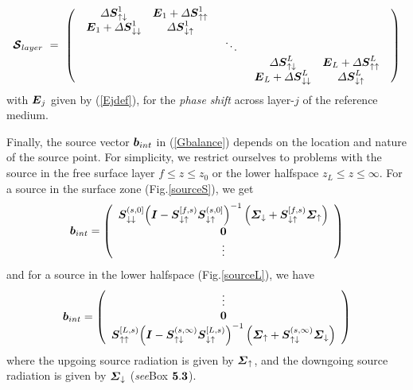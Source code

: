 \begin{equation} \label{Slayer}
{\mbox{\boldmath$\cal S$\unboldmath}}_{{layer}} \ =\ \left({\begin{array}{ccc}
\begin{array}{cc}{\mit \Delta}{\mbox{\boldmath$\mit S$\unboldmath}}_{\uparrow
\downarrow }^{1}&{\mbox{\boldmath$\mit E$\unboldmath}}_{1}+{\mit \Delta}{\mbox{\boldmath$\mit S$\unboldmath}}_{\uparrow \uparrow }^{1}\\ 
{\mbox{\boldmath$\mit E$\unboldmath}}_{1}+{\mit \Delta}{\mbox{\boldmath$\mit S$\unboldmath}}_{\downarrow\downarrow }^{1}&{\mit \Delta}{\mbox{\boldmath$\mit S$\unboldmath}}_{\downarrow \uparrow }^{1}
\end{array}&&\\ 
& \ddots &\\  
&&\begin{array}{cc}{\mit \Delta}{\mbox{\boldmath$\mit S$\unboldmath}}_{\uparrow \downarrow 
}^{L}&{\mbox{\boldmath$\mit E$\unboldmath}}_{L}+{\mit \Delta}{\mbox{\boldmath$\mit S$\unboldmath}}_{\uparrow \uparrow }^{L}\\ 
{\mbox{\boldmath$\mit E$\unboldmath}}_{L}+{\mit \Delta}{\mbox{\boldmath$\mit S$\unboldmath}}_{\downarrow \downarrow }^{L}
&{\mit \Delta}{\mbox{\boldmath$\mit S$\unboldmath}}_{\downarrow \uparrow }^{L}\end{array}
\end{array}}\right)
\end{equation}
with ${\mbox{\boldmath$\mit E$\unboldmath}}_{j}$ given by (\ref{Ejdef}), for
the {\em phase shift\/} across layer-$j$ of the reference medium. 

Finally, the source vector ${\mbox{\boldmath$\mit b$\unboldmath}}_{{int}}$ in (\ref{Gbalance})  
depends on the location and nature of the source point. For simplicity, 
we restrict ourselves to problems with the source in the free surface 
layer $f\le z \le z_0$ or the lower halfspace $z_L \le z \le \infty$.
For a source in the surface zone (Fig.\ref{sourceS}), we get
\begin{equation} \label{SurfSdef}
{\mbox{\boldmath$\mit b$\unboldmath}}_{{int}}=\left({\begin{array}{c}{\mbox{\boldmath$\mit S$\unboldmath}}_{ \downarrow \downarrow
}^{(s,0]}{\left({{\mbox{\boldmath$\mit I$\unboldmath}}-{\mbox{\boldmath$\mit S$\unboldmath}}_{ \downarrow \uparrow }^{[f,s)}{\mbox{\boldmath$\mit S$\unboldmath}}_{
\downarrow\uparrow }^{(s,0]}}\right)}^{-1}\left({{\mbox{\boldmath$\mit \Sigma$\unboldmath}}_{ \downarrow
}+{\mbox{\boldmath$\mit S$\unboldmath}}_{
\downarrow \uparrow }^{[f,s)}{\mbox{\boldmath$\mit \Sigma$\unboldmath}}_{ \uparrow }}\right)\\ {\bf 0}\\
\vdots\end{array}}\right)
\end{equation}
and for a source in the lower halfspace (Fig.\ref{sourceL}), we have
\begin{equation} \label{LowerSdef}
{\mbox{\boldmath$\mit b$\unboldmath}}_{{int}}=
\left({\begin{array}{c}\vdots\\ {\bf 0}\\ {\mbox{\boldmath$\mit S$\unboldmath}}_{ \uparrow \uparrow}^{[L,s)}
{\left({{\mbox{\boldmath$\mit I$\unboldmath}}-{\mbox{\boldmath$\mit S$\unboldmath}}_{ \uparrow \downarrow }^{(s,\infty)}{\mbox{\boldmath$\mit S$\unboldmath}}_{
\downarrow\uparrow }^{[L,s)}}\right)}^{-1}\left({{\mbox{\boldmath$\mit \Sigma$\unboldmath}}_{ \uparrow
}+{\mbox{\boldmath$\mit S$\unboldmath}}_{\uparrow \downarrow }^{(s,\infty)}{\mbox{\boldmath$\mit \Sigma$\unboldmath}}_{ \downarrow}}\right)
\end{array}}\right)
\end{equation}
where the upgoing source radiation is given by ${\mbox{\boldmath$\mit \Sigma$\unboldmath}}_{\uparrow}$, 
and the downgoing source radiation is given by ${\mbox{\boldmath$\mit \Sigma$\unboldmath}}_{\downarrow}$
({\em see\/}{\sc Box} $\bf 5.3$). 

